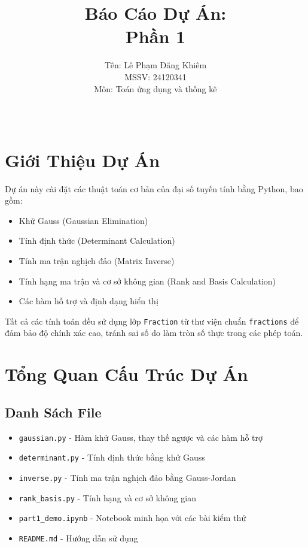 \documentclass[12pt, a4paper, twoside]{article}
\title{\textbf{Báo Cáo Dự Án:\\ \Huge Phần 1}}
\author{ Tên: Lê Phạm Đăng Khiêm\\MSSV: 24120341 \\Môn: Toán ứng dụng và thống kê}
\date{\\}
\begin{document}
\maketitle

\tableofcontents
\newpage

\section{Giới Thiệu Dự Án}

Dự án này cài đặt các thuật toán cơ bản của đại số tuyến tính bằng Python, bao gồm:
\begin{itemize}
    \item Khử Gauss (Gaussian Elimination)
    \item Tính định thức (Determinant Calculation)
    \item Tính ma trận nghịch đảo (Matrix Inverse)
    \item Tính hạng ma trận và cơ sở không gian (Rank and Basis Calculation)
    \item Các hàm hỗ trợ và định dạng hiển thị
\end{itemize}

Tất cả các tính toán đều sử dụng lớp \texttt{Fraction} từ thư viện chuẩn \texttt{fractions} để đảm bảo độ chính xác cao, tránh sai số do làm tròn số thực trong các phép toán.

\section{Tổng Quan Cấu Trúc Dự Án}

\subsection{Danh Sách File}
\begin{itemize}
    \item \texttt{gaussian.py} - Hàm khử Gauss, thay thế ngược và các hàm hỗ trợ
    \item \texttt{determinant.py} - Tính định thức bằng khử Gauss
    \item \texttt{inverse.py} - Tính ma trận nghịch đảo bằng Gauss-Jordan
    \item \texttt{rank\_basis.py} - Tính hạng và cơ sở không gian
    \item \texttt{part1\_demo.ipynb} - Notebook minh họa với các bài kiểm thử
    \item \texttt{README.md} - Hướng dẫn sử dụng
\end{itemize}
\end{document}

